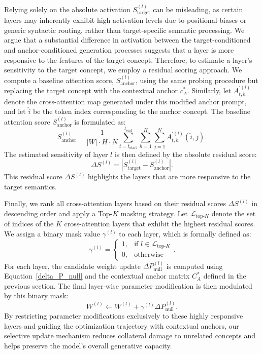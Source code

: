 \documentclass[letterpaper]{article} %
\begin{document}
Relying solely on the absolute activation $S_{\text{target}}^{(l)}$ can be misleading, as certain layers may inherently exhibit high activation levels due to positional biases or generic syntactic routing, rather than target-specific semantic processing. We argue that a substantial difference in activation between the target-conditioned and anchor-conditioned generation processes suggests that a layer is more responsive to the features of the target concept. Therefore, to estimate a layer's sensitivity to the target concept, we employ a residual scoring approach. We compute a baseline attention score, $S_{\text{anchor}}^{(l)}$, using the same probing procedure but replacing the target concept with the contextual anchor \(c_A^*\). Similarly, let $A_{t,h}^{\prime (l)}$ denote the cross-attention map generated under this modified anchor prompt, and let $\hat{i}$ be the token index corresponding to the anchor concept. The baseline attention score $S_{\text{anchor}}^{(l)}$ is formulated as:
\begin{equation}
    S_{\text{anchor}}^{(l)} = \frac{1}{|W| \cdot H \cdot N} \sum_{t = t_{\text{start}}}^{t_{\text{end}}} \sum_{h=1}^{H} \sum_{j=1}^{N} A_{t,h}^{\prime (l)}(\hat{i}, j) .
\end{equation}
The estimated sensitivity of layer $l$ is then defined by the absolute residual score:
\begin{equation}
    \Delta S^{(l)} = \left| S_{\text{target}}^{(l)} - S_{\text{anchor}}^{(l)} \right| .
\end{equation}
This residual score $\Delta S^{(l)}$ highlights the layers that are more responsive to the target semantics.

Finally, we rank all cross-attention layers based on their residual scores $\Delta S^{(l)}$ in descending order and apply a Top-$K$ masking strategy. Let $\mathcal{L}_{\text{top-}K}$ denote the set of indices of the $K$ cross-attention layers that exhibit the highest residual scores. We assign a binary mask value $\gamma^{(l)}$ to each layer, which is formally defined as:
\begin{equation}
    \gamma^{(l)} = \begin{cases} 1, & \text{if } l \in \mathcal{L}_{\text{top-}K} \\ 0, & \text{otherwise} \end{cases} .
\end{equation}
For each layer, the candidate weight update $\Delta P_{\text{null}}^{(l)}$ is computed using Equation~\eqref{delta_P_null} and the contextual anchor matrix $C^*_A$ defined in the previous section. The final layer-wise parameter modification is then modulated by this binary mask:
\begin{equation}
    W^{(l)} \leftarrow W^{(l)} + \gamma^{(l)} \Delta P_{\text{null}}^{(l)} .
\end{equation}
By restricting parameter modifications exclusively to these highly responsive layers and guiding the optimization trajectory with contextual anchors, our selective update mechanism reduces collateral damage to unrelated concepts and helps preserve the model's overall generative capacity.
\end{document}
